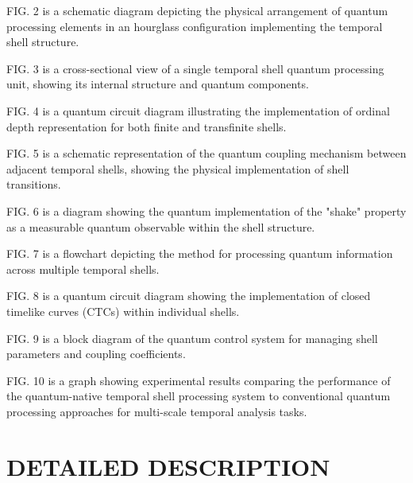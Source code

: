 \documentclass[12pt,letterpaper]{article}
\begin{document}
FIG. 2 is a schematic diagram depicting the physical arrangement of quantum processing elements in an hourglass configuration implementing the temporal shell structure.

FIG. 3 is a cross-sectional view of a single temporal shell quantum processing unit, showing its internal structure and quantum components.

FIG. 4 is a quantum circuit diagram illustrating the implementation of ordinal depth representation for both finite and transfinite shells.

FIG. 5 is a schematic representation of the quantum coupling mechanism between adjacent temporal shells, showing the physical implementation of shell transitions.

FIG. 6 is a diagram showing the quantum implementation of the "shake" property as a measurable quantum observable within the shell structure.

FIG. 7 is a flowchart depicting the method for processing quantum information across multiple temporal shells.

FIG. 8 is a quantum circuit diagram showing the implementation of closed timelike curves (CTCs) within individual shells.

FIG. 9 is a block diagram of the quantum control system for managing shell parameters and coupling coefficients.

FIG. 10 is a graph showing experimental results comparing the performance of the quantum-native temporal shell processing system to conventional quantum processing approaches for multi-scale temporal analysis tasks.

\section*{DETAILED DESCRIPTION}

\end{document}
